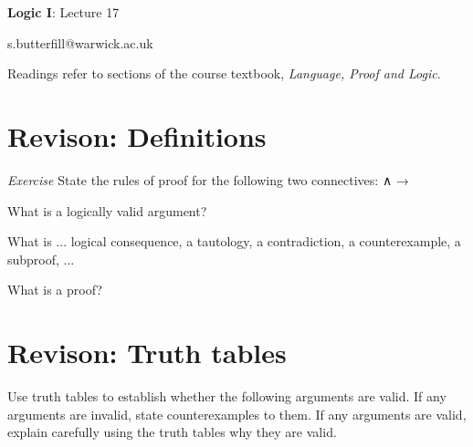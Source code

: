 \documentclass[12pt]{extarticle}
\date{}
\makeatletter
\def \ititle {Origins of Mind}
\def \isubtitle {Lecture 08}
\def \iemail{s.butterfill@warwick.ac.uk}
\makeatother
\begin{document}

\begin{multicols*}{3}

\setlength\footnotesep{1em}







\def \ititle {Logic I}
 
\def \isubtitle {Lecture 17}
 
\begin{center}
 
{\Large
 
\textbf{\ititle}: \isubtitle
 
}
 
 
 
\iemail %
 
\end{center}
 
Readings refer to sections of the course textbook, \emph{Language, Proof and Logic}.
 
 
 
\section{Revison: Definitions}
 
\emph{Exercise} State the rules of proof for the following two connectives: ∧ →
 
What is a logically valid argument?
 
What is ... logical consequence, a tautology, a contradiction, a counterexample, a subproof, ...
 
What is a proof?
 
 
 
\section{Revison: Truth tables}
 
Use truth tables to establish whether the following arguments are valid. If any arguments are invalid, state counterexamples to them. If any arguments are valid, explain carefully using the truth tables why they are valid.
 
\begin{enumerate}
 

\end{enumerate}
\end{multicols*}
\end{document}
